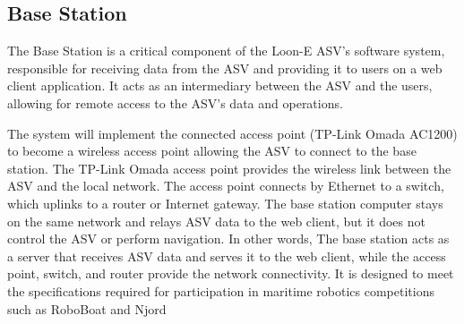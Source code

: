 %
%
%
%


\subsection{Base Station}
\label{sec:basestation}
The Base Station is a critical component of the Loon-E ASV's software system, responsible for receiving data from the ASV and providing it to users on a web client application. It acts as an intermediary between the ASV and the users, allowing for remote access to the ASV's data and operations.


The system will implement the connected access point (TP-Link Omada AC1200) to become a wireless access point allowing the ASV to connect to the base station.
The TP-Link Omada access point provides the wireless link between the ASV and the local network. The access point connects by Ethernet to a switch, which uplinks to a router or Internet gateway. The base station computer stays on the same network and relays ASV data to the web client, but it does not control the ASV or perform navigation.
In other words, The base station acts as a server that receives ASV data and serves it to the web client, while the access point, switch, and router provide the network connectivity.
It is designed to meet the specifications required for participation in maritime robotics competitions such as RoboBoat and Njord



